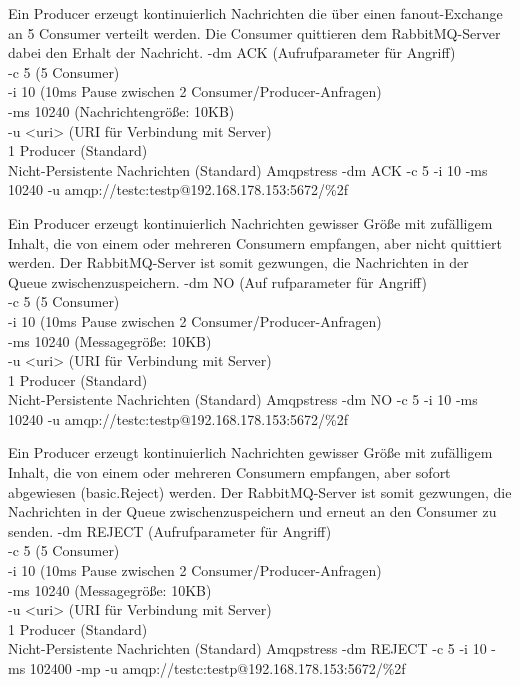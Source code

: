 \documentclass[	a4paper,
			11pt,
			titlepage,
			oneside,
			fleqn,
			listof=totoc,
			parskip,
			numbers=noenddot]{scrartcl}
\begin{document}
		{%
		 Ein Producer erzeugt kontinuierlich Nachrichten die über einen \glqq fanout\grqq-Exchange an 5 Consumer verteilt werden. Die Consumer quittieren dem RabbitMQ-Server dabei den Erhalt der Nachricht.
		}{%
		 -dm ACK (Aufrufparameter für Angriff) \\
		 -c 5 (5 Consumer) \\
		 -i 10 (10ms Pause zwischen 2 Consumer/Producer-Anfragen) \\
		 -ms 10240 (Nachrichtengröße: 10KB) \\
		 -u <uri> (URI für Verbindung mit Server) \\
		 1 Producer (Standard) \\
		 Nicht-Persistente Nachrichten (Standard)
		}{%
		 Amqpstress -dm ACK -c 5 -i 10 -ms 10240 -u amqp://testc:testp@192.168.178.153:5672/\%2f
		}


		{%
		 Ein Producer erzeugt kontinuierlich Nachrichten gewisser Größe mit zufälligem Inhalt, die von einem oder mehreren Consumern empfangen, aber nicht quittiert werden.
		 Der RabbitMQ-Server ist somit gezwungen, die Nachrichten in der Queue zwischenzuspeichern.
		}{%
		 -dm NO (Auf
		 rufparameter für Angriff) \\
		 -c 5 (5 Consumer) \\
		 -i 10 (10ms Pause zwischen 2 Consumer/Producer-Anfragen) \\
		 -ms 10240 (Messagegröße: 10KB) \\
		 -u <uri> (URI für Verbindung mit Server) \\
		 1 Producer (Standard) \\
		 Nicht-Persistente Nachrichten (Standard)
		}{%
		 Amqpstress -dm NO -c 5 -i 10 -ms 10240 -u amqp://testc:testp@192.168.178.153:5672/\%2f
		}


		{%
		 Ein Producer erzeugt kontinuierlich Nachrichten gewisser Größe mit zufälligem Inhalt, die von einem oder mehreren Consumern empfangen, aber sofort abgewiesen (basic.Reject) werden.
		 Der RabbitMQ-Server ist somit gezwungen, die Nachrichten in der Queue zwischenzuspeichern und erneut an den Consumer zu senden.
		}{%
		 -dm REJECT (Aufrufparameter für Angriff) \\
		 -c 5 (5 Consumer) \\
		 -i 10 (10ms Pause zwischen 2 Consumer/Producer-Anfragen) \\
		 -ms 10240 (Messagegröße: 10KB) \\
		 -u <uri> (URI für Verbindung mit Server) \\
		 1 Producer (Standard) \\
		 Nicht-Persistente Nachrichten (Standard)
		}{%
		 Amqpstress -dm REJECT -c 5 -i 10 -ms 102400 -mp -u amqp://testc:testp@192.168.178.153:5672/\%2f
		}
		
\end{document}
